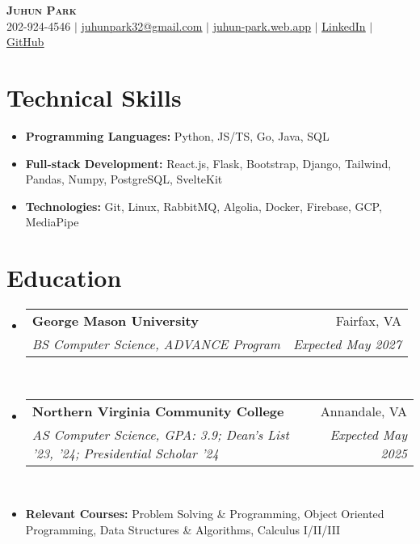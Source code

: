 \documentclass[letterpaper,11pt]{article}
\makeatletter
\newcommand{\resumeItem}[1]{
  \item\small{
    {#1 \vspace{0pt}}
  }
}
\newcommand{\resumeItemThin}[1]{
  \item\small{
    {#1 \vspace{-5pt}}
  }
}
\newcommand{\resumeSubheading}[4]{
    \item
    \begin{tabular*}{0.985\textwidth}[t]{l@{\extracolsep{\fill}}r@{\hspace{-0.1in}}}
        \small{\textbf{#1}} & \small{#2} \\
        \textit{\small#3} & \textit{\small #4} \\
    \end{tabular*}\vspace{-5pt}
}
\newcommand{\resumeSubHeadingListStart}{\begin{itemize}[leftmargin=0.00in, rightmargin=-0.2in, label={}]\vspace{1pt}}
\newcommand{\resumeSubHeadingListEnd}{\end{itemize}\vspace{-9pt}}
\newcommand{\resumeItemListStart}{\begin{itemize}[leftmargin=0.15in, rightmargin=0.15in]}
\newcommand{\resumeItemListEnd}{\end{itemize}\vspace{-5pt}}
\makeatother
\begin{document}

\begin{center}
  \textbf{\Huge \scshape {Juhun Park}} \\ \vspace{1pt}
  \small 202-924-4546 $|$
  \href{mailto:riann3207@gmail.com}{\underline{juhunpark32@gmail.com}} $|$
  \href{https://juhun-park.web.app/}{\underline{juhun-park.web.app}} $|$
  \href{https://linkedin.com/in/juhun-park}{\underline{LinkedIn}} $|$
  \href{https://github.com/juhun32}{\underline{GitHub}} \\
\end{center}

\vspace{-7pt}


\section{Technical Skills}
\vspace{5pt}
\resumeItemListStart
\resumeItemThin{\textbf{Programming Languages: }{Python, JS/TS, Go, Java, SQL}}\\
\resumeItemThin{\textbf{Full-stack Development: }{React.js, Flask, Bootstrap, Django, Tailwind, Pandas, Numpy, PostgreSQL, SvelteKit}}\\
\resumeItemThin{\textbf{Technologies: }{Git, Linux, RabbitMQ, Algolia, Docker, Firebase, GCP, MediaPipe}}\\
\resumeItemListEnd


\section{Education}
\resumeSubHeadingListStart
\resumeSubheading
{George Mason University}{Fairfax, VA}
{BS Computer Science, ADVANCE Program}{Expected May 2027}\\

\resumeSubheading
{Northern Virginia Community College}{Annandale, VA}
{AS Computer Science, GPA: 3.9; Dean's List '23, '24; Presidential Scholar '24}{Expected May 2025} \\

\resumeItem{\textbf{Relevant Courses: }{Problem Solving \& Programming, Object Oriented Programming, Data Structures \& Algorithms, Calculus I/II/III}}
\resumeSubHeadingListEnd

\end{document}
